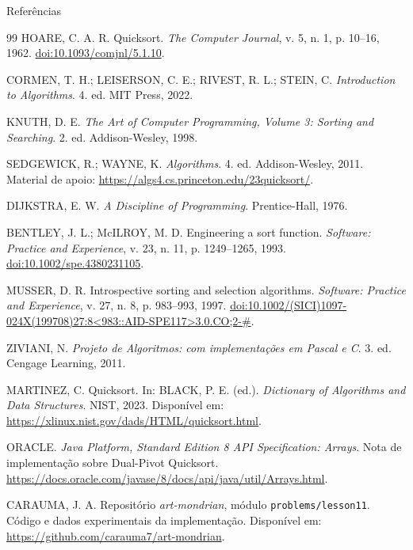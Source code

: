 \documentclass[aspectratio=169,11pt]{beamer}
\begin{document}
\begin{frame}[allowframebreaks]{Referências}
  \footnotesize
  \begin{thebibliography}{99}
      HOARE, C. A. R. Quicksort. \textit{The Computer Journal}, v. 5, n. 1, p. 10--16, 1962.
      \href{https://doi.org/10.1093/comjnl/5.1.10}{doi:10.1093/comjnl/5.1.10}.

      CORMEN, T. H.; LEISERSON, C. E.; RIVEST, R. L.; STEIN, C.
      \textit{Introduction to Algorithms}. 4. ed. MIT Press, 2022.

      KNUTH, D. E. \textit{The Art of Computer Programming, Volume 3: Sorting and Searching}.
      2. ed. Addison-Wesley, 1998.

      SEDGEWICK, R.; WAYNE, K. \textit{Algorithms}. 4. ed. Addison-Wesley, 2011.
      Material de apoio: \url{https://algs4.cs.princeton.edu/23quicksort/}.

      DIJKSTRA, E. W. \textit{A Discipline of Programming}. Prentice-Hall, 1976.

      BENTLEY, J. L.; McILROY, M. D. Engineering a sort function.
      \textit{Software: Practice and Experience}, v. 23, n. 11, p. 1249--1265, 1993.
      \href{https://doi.org/10.1002/spe.4380231105}{doi:10.1002/spe.4380231105}.

      MUSSER, D. R. Introspective sorting and selection algorithms.
      \textit{Software: Practice and Experience}, v. 27, n. 8, p. 983--993, 1997.
      \href{https://doi.org/10.1002/(SICI)1097-024X(199708)27:8\%3C983::AID-SPE117\%3E3.0.CO;2-\%23}
      {doi:10.1002/(SICI)1097-024X(199708)27:8<983::AID-SPE117>3.0.CO;2-\#}.

      ZIVIANI, N. \textit{Projeto de Algoritmos: com implementações em Pascal e C}.
      3. ed. Cengage Learning, 2011.

      MARTINEZ, C. Quicksort. In: BLACK, P. E. (ed.). \textit{Dictionary of Algorithms and Data Structures}.
      NIST, 2023. Disponível em: \url{https://xlinux.nist.gov/dads/HTML/quicksort.html}.

      ORACLE. \textit{Java Platform, Standard Edition 8 API Specification: Arrays}.
      Nota de implementação sobre Dual-Pivot Quicksort.
      \url{https://docs.oracle.com/javase/8/docs/api/java/util/Arrays.html}.

      CARAUMA, J. A. Repositório \textit{art-mondrian}, módulo \texttt{problems/lesson11}.
      Código e dados experimentais da implementação. Disponível em:
      \url{https://github.com/carauma7/art-mondrian}.
  \end{thebibliography}
\end{frame}
\end{document}
